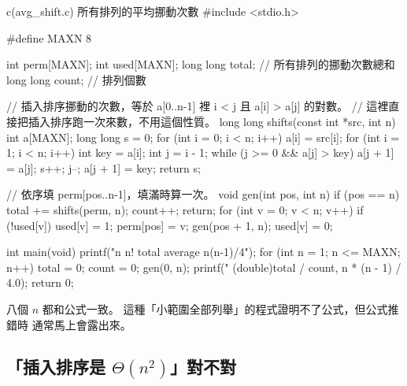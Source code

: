 \begin{example}[label=ex:avg-shift]{c}{(avg\_shift.c) 所有排列的平均挪動次數}
#include <stdio.h>

#define MAXN 8

int perm[MAXN];
int used[MAXN];
long long total;        // 所有排列的挪動次數總和
long long count;        // 排列個數

// 插入排序挪動的次數，等於 a[0..n-1] 裡 i < j 且 a[i] > a[j] 的對數。
// 這裡直接把插入排序跑一次來數，不用這個性質。
long long shifts(const int *src, int n)
{
    int a[MAXN];
    long long s = 0;
    for (int i = 0; i < n; i++)
        a[i] = src[i];
    for (int i = 1; i < n; i++) {
        int key = a[i];
        int j = i - 1;
        while (j >= 0 && a[j] > key) {
            a[j + 1] = a[j];
            s++;
            j--;
        }
        a[j + 1] = key;
    }
    return s;
}

// 依序填 perm[pos..n-1]，填滿時算一次。
void gen(int pos, int n)
{
    if (pos == n) {
        total += shifts(perm, n);
        count++;
        return;
    }
    for (int v = 0; v < n; v++) {
        if (!used[v]) {
            used[v] = 1;
            perm[pos] = v;
            gen(pos + 1, n);
            used[v] = 0;
        }
    }
}

int main(void)
{
    printf("n n! total average n(n-1)/4\n");
    for (int n = 1; n <= MAXN; n++) {
        total = 0;
        count = 0;
        gen(0, n);
        printf("%
               (double)total / count, n * (n - 1) / 4.0);
    }
    return 0;
}
\end{example}

八個 $n$ 都和公式一致。 這種「小範圍全部列舉」的程式證明不了公式，但公式推錯時
通常馬上會露出來。

\subsection{「插入排序是 $\Theta(n^2)$」對不對}

